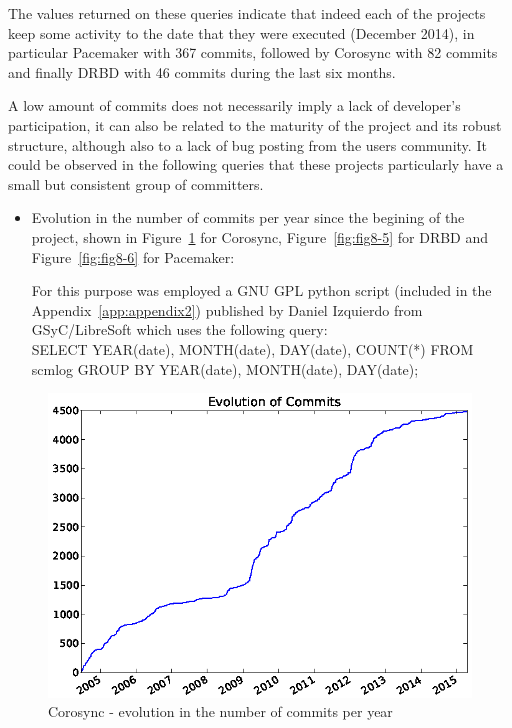 \documentclass[a4paper, 12pt]{book}
\begin{document}
\noindent The values returned on these queries indicate that indeed each of the projects keep some activity to the date that they were executed (December 2014), in particular Pacemaker with 367 commits, followed by Corosync with 82 commits and finally DRBD with 46 commits during the last six months.\bigskip

\noindent A low amount of commits does not necessarily imply a lack of developer's participation, it can also be related to the maturity of the project and its robust structure, although also to a lack of bug posting from the users community. It could be observed in the following queries that these projects particularly have a small but consistent group of committers.


\begin{itemize}
      \item Evolution in the number of commits per year since the begining of the project, shown in Figure~\ref{fig:fig8-4} for Corosync, Figure~\ref{fig:fig8-5} for DRBD and Figure~\ref{fig:fig8-6} for Pacemaker:
      
      For this purpose was employed a GNU GPL python script (included in the Appendix~\ref{app:appendix2}) published by Daniel Izquierdo from GSyC/LibreSoft which uses the following query:\\
      SELECT YEAR(date), MONTH(date), DAY(date), COUNT(*) FROM scmlog GROUP BY YEAR(date), MONTH(date), DAY(date);
\end{itemize}

    \begin{figure}[H]
      \centering
      \includegraphics[scale=0.50]{fig8-4.png}
      \caption[Evolution in the number of commits for Corosync]{Corosync - evolution in the number of commits per year}
      \label{fig:fig8-4}
    \end{figure}
	  
\end{document}
